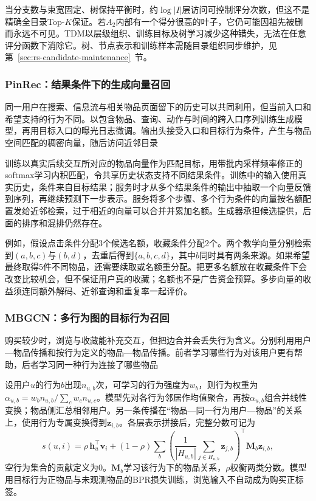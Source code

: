 当分支数与束宽固定、树保持平衡时，约$\log |I|$层访问可控制评分次数，但这不是精确全目录Top-$K$保证。若$A_2$内部有一个得分很高的叶子，它仍可能因祖先被删而永远不可见。TDM以层级组织、训练目标及树学习减少这种错失，无法在任意评分函数下消除它。树、节点表示和训练样本需随目录组织同步维护，见第~\ref{sec:rs-candidate-maintenance}~节。

\Needspace{85mm}
\subsubsection{PinRec：结果条件下的生成向量召回}
\label{sec:rs-pinrec}

同一用户在搜索、信息流与相关物品页面留下的历史可以共同利用，但当前入口和希望支持的行为不同。以包含物品、查询、动作与时间的跨入口序列训练生成模型，再用目标入口的曝光日志微调。输出头接受入口和目标行为条件，产生与物品空间匹配的稠密向量，随后访问近邻目录

训练以真实后续交互所对应的物品向量作为匹配目标，用带批内采样频率修正的softmax学习内积匹配，令共享历史状态支持不同结果条件。训练中的输入使用真实历史，条件来自目标结果；服务时才从多个结果条件的输出中抽取一个向量反馈到序列，再继续预测下一步表示。服务将多个步骤、多个行为条件的向量按名额配置发给近邻检索，过于相近的向量可以合并并累加名额。生成器承担候选提供，后面的排序和混排仍然存在。

例如，假设点击条件分配3个候选名额，收藏条件分配2个。两个教学向量分别检索到$(a,b,c)$与$(b,d)$，去重后得到$\{a,b,c,d\}$，其中$b$同时具有两条来源。如果希望最终取得5件不同物品，还需要续取或名额重分配。把更多名额放在收藏条件下会改变比较机会，但不保证用户真的收藏；名额也不是广告资金预算。多步向量的收益须连同额外解码、近邻查询和重复率一起评价。

\subsubsection{MBGCN：多行为图的目标行为召回}
\label{sec:rs-mbgcn}

购买较少时，浏览与收藏能补充交互，但把边合并会丢失行为含义。分别利用用户—物品传播和按行为定义的物品—物品传播。前者学习哪些行为对该用户更有帮助，后者学习同一种行为连接了哪些物品

设用户$u$的行为$b$出现$n_{u,b}$次，可学习的行为强度为$w_b$，则行为权重为$\alpha_{u,b}=w_bn_{u,b}/\sum_cw_cn_{u,c}$。模型先对各行为邻居作均值聚合，再按$\alpha_{u,b}$组合并线性变换；物品侧汇总相邻用户。另一条传播在“物品—同一行为用户—物品”的关系上，使用行为专属变换得到$\bm z_{i,b}$。各层表示拼接后，完整分数可记为
\begin{equation}
 s(u,i)=\rho\,\bm h_u^\top\bm v_i+
 (1-\rho)\sum_b\left(
 \frac1{|H_{u,b}|}\sum_{j\in H_{u,b}}\bm z_{j,b}\right)^\top
 \bm M_b\bm z_{i,b},
 \label{eq:rs-mbgcn-score}
\end{equation}
空行为集合的贡献定义为0。$\bm M_b$学习该行为下的物品关系，$\rho$权衡两类分数。模型用目标行为正物品与未观测物品的BPR损失训练，浏览输入不自动成为购买正标签。

